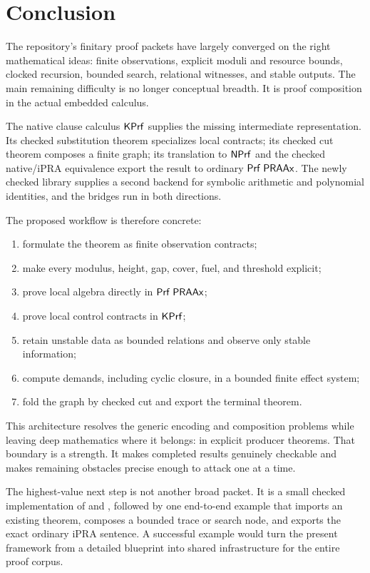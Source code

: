 \section{Conclusion}

The repository's finitary proof packets have largely converged on the right
mathematical ideas: finite observations, explicit moduli and resource bounds,
clocked recursion, bounded search, relational witnesses, and stable outputs.
The main remaining difficulty is no longer conceptual breadth.  It is proof
composition in the actual embedded calculus.

The native clause calculus \(\mathsf{KPrf}\) supplies the missing intermediate
representation.  Its checked substitution theorem specializes local contracts;
its checked cut theorem composes a finite graph; its translation to
\(\mathsf{NPrf}\) and the checked native/iPRA equivalence export the result to ordinary
\(\mathsf{Prf}\;\mathsf{PRAAx}\).  The newly checked  library supplies a
second backend for symbolic arithmetic and polynomial identities, and the
bridges run in both directions.

The proposed workflow is therefore concrete:

\begin{enumerate}
\item formulate the theorem as finite observation contracts;
\item make every modulus, height, gap, cover, fuel, and threshold explicit;
\item prove local algebra directly in \(\mathsf{Prf}\;\mathsf{PRAAx}\);
\item prove local control contracts in \(\mathsf{KPrf}\);
\item retain unstable data as bounded relations and observe only stable
information;
\item compute demands, including cyclic closure, in a bounded finite effect
system;
\item fold the graph by checked cut and export the terminal theorem.
\end{enumerate}

This architecture resolves the generic encoding and composition problems while
leaving deep mathematics where it belongs: in explicit producer theorems.
That boundary is a strength.  It makes completed results genuinely checkable
and makes remaining obstacles precise enough to attack one at a time.

The highest-value next step is not another broad packet.  It is a small checked
implementation of  and , followed by one
end-to-end example that imports an existing  theorem, composes a
bounded trace or search node, and exports the exact ordinary iPRA sentence.  A
successful example would turn the present framework from a detailed blueprint
into shared infrastructure for the entire proof corpus.

